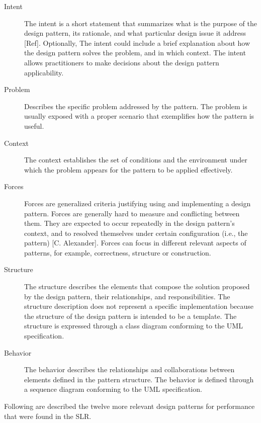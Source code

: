 \begin{description}
	\item [Intent] 	The intent is a short statement that summarizes what is the purpose of the design pattern, its rationale, and what particular design issue it address [Ref]. Optionally, The intent could include a brief explanation about how the design pattern solves the problem, and in which context. The intent allows practitioners to make decisions about the design pattern applicability.
	\item [Problem] Describes the specific problem addressed by the pattern. The problem is usually exposed with a proper scenario that exemplifies how the pattern is useful.
	\item [Context] The context establishes the set of conditions and the environment under which the problem appears for the pattern to be applied effectively.
	\item [Forces] Forces are generalized criteria justifying using and implementing a design pattern. Forces are generally hard to measure and conflicting between them. They are expected to occur repeatedly in the design pattern's context, and to resolved themselves under certain configuration (i.e., the pattern) [C. Alexander]. Forces can focus in different relevant aspects of patterns, for example, correctness, structure or construction. \\
		
	\item [Structure] The structure describes the elements that compose the solution proposed by the design pattern, their relationships, and responsibilities. The structure description does not represent a specific implementation because the structure of the design pattern is intended to be a template. The structure is expressed through a class diagram conforming to the UML specification.
	\item [Behavior] The behavior describes the relationships and collaborations between elements defined in the pattern structure. The behavior is defined through a sequence diagram conforming to the UML specification.
\end{description}

Following are described the twelve more relevant design patterns for performance that were found in the SLR.





